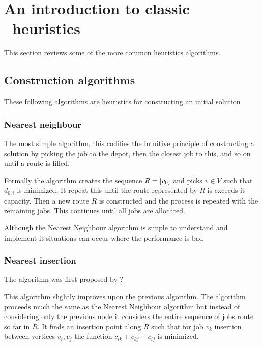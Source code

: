 \subsection{\PDPTW}


\section{An introduction to classic \VRP\ heuristics}

This section reviews some of the more common heuristics algorithms. 

\subsection{Construction algorithms}
These following algorithms are heuristics for constructing an initial solution

\subsubsection{Nearest neighbour}
The most simple algorithm, this codifies the intuitive principle of constructing a solution by picking the job to the depot, then the closest job to this, and so on until a route is filled.

Formally the algorithm creates the sequence $R = [v_0]$ and picks $v \in V$ such that $d_{0,i}$ is minimized. It repeat this until the route represented by $R$ is exceeds it capacity. Then a new route $R$ is constructed and the process is repeated with the remaining jobs. This continues until all jobs are allocated.

Although the Nearest Neighbour algorithm is simple to understand and implement it situations can occur where the performance is bad

\subsubsection{Nearest insertion}

The algorithm was first proposed by ?

This algorithm slightly improves upon the previous algorithm. The algorithm proceeds much the same as the Nearest Neighbour algorithm but instead of considering only the previous node it considers the entire sequence of jobs route so far in $R$. It finds an insertion point along $R$ such that for job $v_k$ insertion between vertices $v_i, v_j$ the function $c_{ik} + c_{kj} - c_{ij}$ is minimized.

